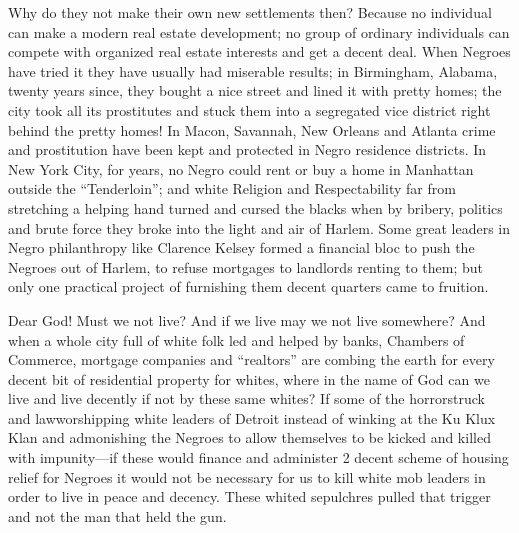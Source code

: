 \documentclass[letterpaper,10pt,english]{jupyterBook}
\begin{document}
\sphinxAtStartPar
Why do they not make their own new settlements then? Because no individual can make a modern real estate development; no group of ordinary individuals can compete with organized real estate interests and get a decent deal. When Negroes have tried it they have usually had miserable results; in Birmingham, Alabama, twenty years since, they bought a nice street and lined it with pretty homes; the city took all its prostitutes and stuck them into a segregated vice district right behind the pretty homes! In Macon, Savannah, New Orleans and Atlanta crime and prostitution have been kept and protected in Negro residence districts. In New York City, for years, no Negro could rent or buy a home in Manhattan outside the “Tenderloin”; and white Religion and Respectability far from stretching a helping hand turned and cursed the blacks when by bribery, politics and brute force they broke into the light and air of Harlem. Some great leaders in Negro philanthropy like Clarence Kelsey formed a financial bloc to push the Negroes out of Harlem, to refuse mortgages to landlords renting to them; but only one practical project of furnishing them decent quarters came to fruition.



\sphinxAtStartPar
Dear God! Must we not live? And if we live may we not live somewhere? And when a whole city full of white folk led and helped by banks, Chambers of Commerce, mortgage companies and “realtors” are combing the earth for every decent bit of residential property for whites, where in the name of God can we live and live decently if not by these same whites? If some of the horror\sphinxhyphen{}struck and law\sphinxhyphen{}worshipping white leaders of Detroit instead of winking at the Ku Klux Klan and admonishing the Negroes to allow themselves to be kicked and killed with impunity—if these would finance and administer 2 decent scheme of housing relief for Negroes it would not be necessary for us to kill white mob leaders \sphinxhyphen{}in order to live in peace and decency. These whited sepulchres pulled that trigger and not the man that held the gun.
\end{document}
